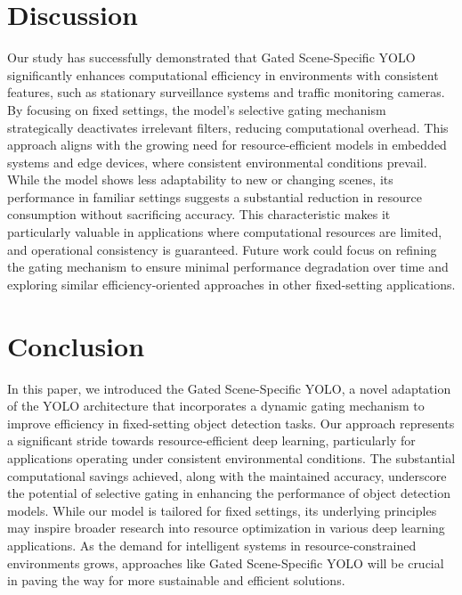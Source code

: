 \documentclass[runningheads]{llncs}
\begin{document}
\section{Discussion}
\label{sec:discussion}
Our study has successfully demonstrated that Gated Scene-Specific YOLO significantly enhances computational efficiency in environments with consistent features, such as stationary surveillance systems and traffic monitoring cameras. By focusing on fixed settings, the model's selective gating mechanism strategically deactivates irrelevant filters, reducing computational overhead. This approach aligns with the growing need for resource-efficient models in embedded systems and edge devices, where consistent environmental conditions prevail. While the model shows less adaptability to new or changing scenes, its performance in familiar settings suggests a substantial reduction in resource consumption without sacrificing accuracy. This characteristic makes it particularly valuable in applications where computational resources are limited, and operational consistency is guaranteed. Future work could focus on refining the gating mechanism to ensure minimal performance degradation over time and exploring similar efficiency-oriented approaches in other fixed-setting applications.

\section{Conclusion}
\label{sec:conclusion}
In this paper, we introduced the Gated Scene-Specific YOLO, a novel adaptation of the YOLO architecture that incorporates a dynamic gating mechanism to improve efficiency in fixed-setting object detection tasks. Our approach represents a significant stride towards resource-efficient deep learning, particularly for applications operating under consistent environmental conditions. The substantial computational savings achieved, along with the maintained accuracy, underscore the potential of selective gating in enhancing the performance of object detection models. While our model is tailored for fixed settings, its underlying principles may inspire broader research into resource optimization in various deep learning applications. As the demand for intelligent systems in resource-constrained environments grows, approaches like Gated Scene-Specific YOLO will be crucial in paving the way for more sustainable and efficient solutions.



\end{document}
